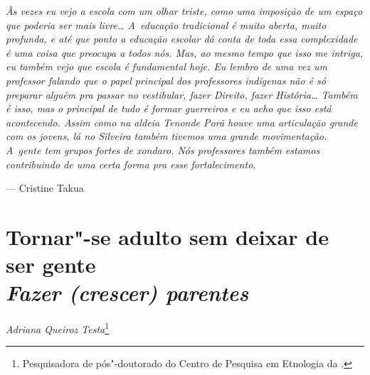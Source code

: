 \clearpage

\vspace*{\fill}

\begin{flushright}
\begin{minipage}[c]{0.85\textwidth}
\raggedleft
\footnotesize
\emph{Às vezes eu vejo a escola com um olhar triste, como uma imposição de um
espaço que poderia ser mais livre\ldots{} A~educação tradicional é muito
aberta, muito profunda, e até que ponto a educação escolar dá conta de
toda essa complexidade é uma coisa que preocupa a todos nós. Mas, ao
mesmo tempo que isso me intriga, eu também vejo que escola é
fundamental hoje. Eu lembro de uma vez um professor falando que o papel
principal dos professores indígenas não é só preparar alguém pra passar
no vestibular, fazer Direito, fazer História\ldots{} Também é isso, mas o
principal de tudo é formar guerreiros e eu acho que isso está
acontecendo. Assim como na aldeia Tenonde Porã houve uma articulação
grande com os jovens, lá no Silveira também tivemos uma grande
movimentação. A~gente tem grupos fortes de \emph{xondaro}. Nós professores
também estamos contribuindo de uma certa forma pra esse fortalecimento.}

\smallskip
\hspace*{\fill}--- Cristine Takua
\end{minipage}
\end{flushright}

\thispagestyle{empty}

\chapter*{Tornar"-se adulto sem deixar de ser gente\\
\large{\emph{Fazer (crescer) parentes}}}


\begin{flushright}
\emph{Adriana Queiroz Testa}\footnote{Pesquisadora de pós"-doutorado do Centro
de Pesquisa em Etnologia da .}
\end{flushright}

